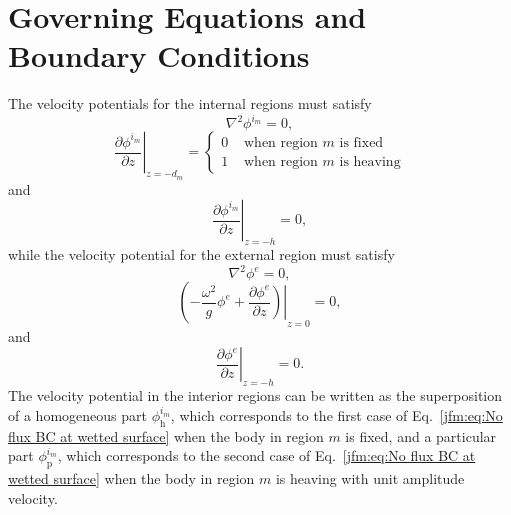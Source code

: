 \section{Governing Equations and Boundary Conditions}\label{jfm:appA}
The velocity potentials for the internal regions must satisfy
\begin{equation}\label{jfm:eq:Laplace equation internal region}
    \nabla^2\phi^{i_m}=0,   
\end{equation}
\begin{equation}\label{jfm:eq:No flux BC at wetted surface}
    \left. \frac{\partial\phi^{i_m}}{\partial z} \right|_{z=-d_m}=
    \begin{cases}
        0 & \text{ when region } m \text{ is fixed} \\
        1 & \text{ when region } m \text{ is heaving}
    \end{cases}
\end{equation}
and
\begin{equation}\label{jfm:eq:No flux BC at sea floor internal}
    \left. \frac{\partial\phi^{i_m}}{\partial z} \right|_{z=-h}=0,   
\end{equation}
while the velocity potential for the external region must satisfy
\begin{equation}\label{jfm:eq:Laplace equation external region}
    \nabla^2\phi^{e}=0,   
\end{equation}
\begin{equation}\label{jfm:eq:Free surface BC}
    \left( -\frac{\omega^2}{g}\phi^{e} + \left. \frac{\partial\phi^{e}}{\partial z} \right) \right|_{z=0}= 0,
\end{equation}
and
\begin{equation}\label{jfm:eq:No flux BC at sea floor external}
    \left. \frac{\partial\phi^{e}}{\partial z} \right|_{z=-h}=0.   
\end{equation}
The velocity potential in the interior regions can be written as the superposition of a homogeneous part $\phi^{i_m}_\mathrm{h}$, which corresponds to the first case of Eq.~\ref{jfm:eq:No flux BC at wetted surface} when the body in region $m$ is fixed, and a particular part $\phi^{i_m}_\mathrm{p}$, which corresponds to the second case of Eq.~\ref{jfm:eq:No flux BC at wetted surface} when the body in region $m$ is heaving with unit amplitude velocity.

